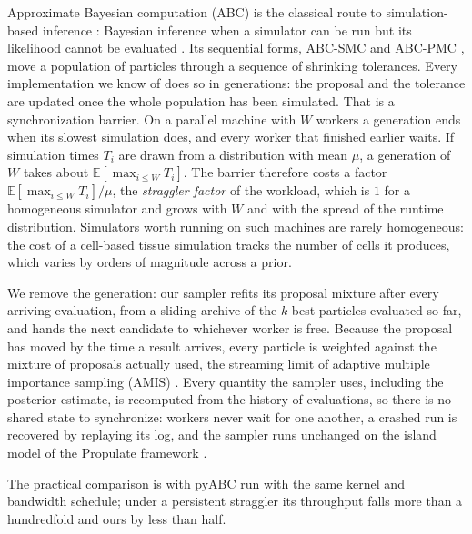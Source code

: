 \documentclass[10pt]{article}
\theoremstyle{plain}
\theoremstyle{definition}
\begin{document}
Approximate Bayesian computation (ABC) is the classical route to simulation-based inference \citep{cranmer2020frontier}: Bayesian inference when a simulator can be run but its likelihood cannot be evaluated \citep{beaumont2019abc}. Its sequential forms, ABC-SMC and ABC-PMC \citep{sisson2007,toni2009abcsmc,beaumont2009adaptive,delmoral2012adaptive}, move a population of particles through a sequence of shrinking tolerances. Every implementation we know of does so in generations: the proposal and the tolerance are updated once the whole population has been simulated. That is a synchronization barrier. On a parallel machine with $W$ workers a generation ends when its slowest simulation does, and every worker that finished earlier waits. If simulation times $T_i$ are drawn from a distribution with mean $\mu$, a generation of $W$ takes about $\mathbb{E}[\max_{i\le W}T_i]$. The barrier therefore costs a factor $\mathbb{E}[\max_{i\le W}T_i]/\mu$, the \emph{straggler factor} of the workload, which is $1$ for a homogeneous simulator and grows with $W$ and with the spread of the runtime distribution. Simulators worth running on such machines are rarely homogeneous: the cost of a cell-based tissue simulation tracks the number of cells it produces, which varies by orders of magnitude across a prior.

We remove the generation: our sampler refits its proposal mixture after every arriving evaluation, from a sliding archive of the $k$ best particles evaluated so far, and hands the next candidate to whichever worker is free. Because the proposal has moved by the time a result arrives, every particle is weighted against the mixture of proposals actually used, the streaming limit of adaptive multiple importance sampling (AMIS) \citep{cornuet2012amis}. Every quantity the sampler uses, including the posterior estimate, is recomputed from the history of evaluations, so there is no shared state to synchronize: workers never wait for one another, a crashed run is recovered by replaying its log, and the sampler runs unchanged on the island model of the Propulate framework \citep{taubert2023propulate}.

The practical comparison is with pyABC \citep{klinger2018pyabc} run with the same kernel and bandwidth schedule; under a persistent straggler its throughput falls more than a hundredfold and ours by less than half.
\end{document}
